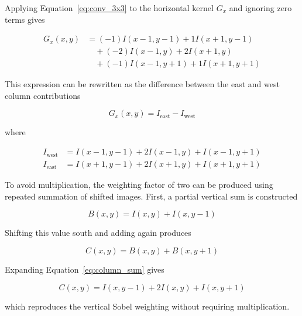 \begin{uomappendix}
    Applying Equation~\eqref{eq:conv_3x3} to the horizontal kernel $G_x$ 
    and ignoring zero terms gives
    
    \begin{equation}
    \begin{aligned}
    G_x(x,y) &= (-1)I(x-1,y-1) + 1I(x+1,y-1) \\
    &\quad + (-2)I(x-1,y) + 2I(x+1,y) \\
    &\quad + (-1)I(x-1,y+1) + 1I(x+1,y+1)
    \end{aligned}
    \label{eq:sobel_expanded}
    \end{equation}
    
    This expression can be rewritten as the difference between the east 
    and west column contributions
    
    \begin{equation}
    G_x(x,y)=I_{\text{east}}-I_{\text{west}}
    \label{eq:sobel_column_difference}
    \end{equation}
    
    where
    
    \begin{align}
    I_{\text{west}} &= I(x-1,y-1)+2I(x-1,y)+I(x-1,y+1)
    \label{eq:sobel_west}\\
    I_{\text{east}} &= I(x+1,y-1)+2I(x+1,y)+I(x+1,y+1)
    \label{eq:sobel_east}
    \end{align}
    
    To avoid multiplication, the weighting factor of two can be produced 
    using repeated summation of shifted images. First, a partial vertical 
    sum is constructed
    
    \begin{equation}
    B(x,y)=I(x,y)+I(x,y-1)
    \label{eq:partial_sum}
    \end{equation}
    
    Shifting this value south and adding again produces
    
    \begin{equation}
    C(x,y)=B(x,y)+B(x,y+1)
    \label{eq:column_sum}
    \end{equation}
    
    Expanding Equation~\eqref{eq:column_sum} gives
    
    \begin{equation}
    C(x,y)=I(x,y-1)+2I(x,y)+I(x,y+1)
    \label{eq:sobel_column_weight}
    \end{equation}
    
    which reproduces the vertical Sobel weighting without requiring 
    multiplication.
    

\end{uomappendix}
